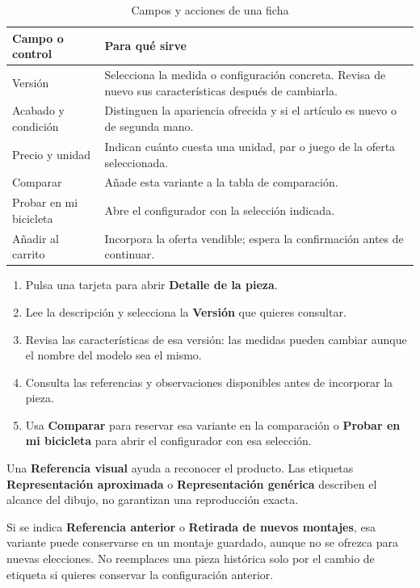 \documentclass[12pt,letterpaper]{article}
\newenvironment{tabla}{\begingroup\singlespacing\small\setlength{\tabcolsep}{5pt}\renewcommand{\arraystretch}{1.25}}{\endgroup}
\newcommand{\control}[1]{\textbf{#1}}
\begin{document}
\begin{table}[H]\caption{Campos y acciones de una ficha}\begin{tabla}\begin{tabularx}{\textwidth}{L{3.6cm}X}\toprule
Campo o control & Para qué sirve\\\midrule
Versión & Selecciona la medida o configuración concreta. Revisa de nuevo sus características después de cambiarla.\\
Acabado y condición & Distinguen la apariencia ofrecida y si el artículo es nuevo o de segunda mano.\\
Precio y unidad & Indican cuánto cuesta una unidad, par o juego de la oferta seleccionada.\\
Comparar & Añade esta variante a la tabla de comparación.\\
Probar en mi bicicleta & Abre el configurador con la selección indicada.\\
Añadir al carrito & Incorpora la oferta vendible; espera la confirmación antes de continuar.\\\bottomrule
\end{tabularx}\end{tabla}\end{table}


\begin{enumerate}
\item Pulsa una tarjeta para abrir \control{Detalle de la pieza}.
\item Lee la descripción y selecciona la \control{Versión} que quieres consultar.
\item Revisa las características de esa versión: las medidas pueden cambiar aunque el nombre del modelo sea el mismo.
\item Consulta las referencias y observaciones disponibles antes de incorporar la pieza.
\item Usa \control{Comparar} para reservar esa variante en la comparación o \control{Probar en mi bicicleta} para abrir el configurador con esa selección.
\end{enumerate}
Una \control{Referencia visual} ayuda a reconocer el producto. Las etiquetas \control{Representación aproximada} o \control{Representación genérica} describen el alcance del dibujo, no garantizan una reproducción exacta.

Si se indica \control{Referencia anterior} o \control{Retirada de nuevos montajes}, esa variante puede conservarse en un montaje guardado, aunque no se ofrezca para nuevas elecciones. No reemplaces una pieza histórica solo por el cambio de etiqueta si quieres conservar la configuración anterior.
\end{document}
